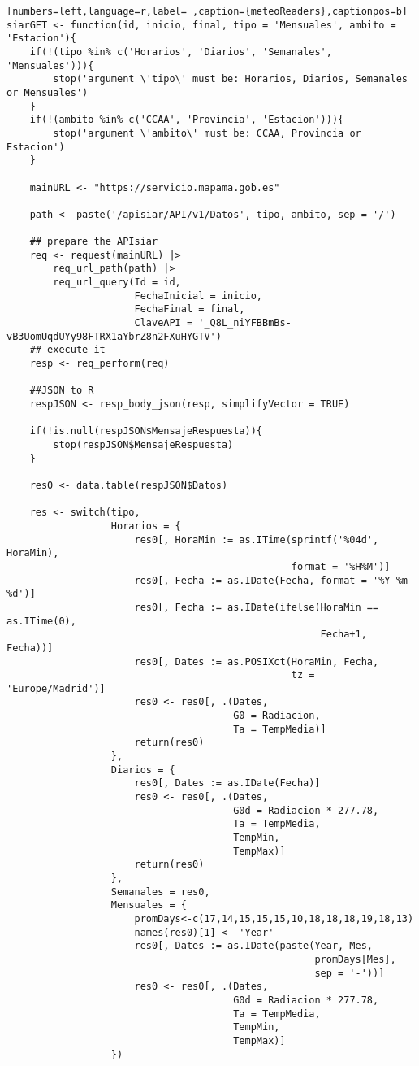 \begin{lstlisting}[numbers=left,language=r,label= ,caption={meteoReaders},captionpos=b]
siarGET <- function(id, inicio, final, tipo = 'Mensuales', ambito = 'Estacion'){
    if(!(tipo %in% c('Horarios', 'Diarios', 'Semanales', 'Mensuales'))){
        stop('argument \'tipo\' must be: Horarios, Diarios, Semanales or Mensuales')
    }
    if(!(ambito %in% c('CCAA', 'Provincia', 'Estacion'))){
        stop('argument \'ambito\' must be: CCAA, Provincia or Estacion')
    }

    mainURL <- "https://servicio.mapama.gob.es"

    path <- paste('/apisiar/API/v1/Datos', tipo, ambito, sep = '/')

    ## prepare the APIsiar
    req <- request(mainURL) |>
        req_url_path(path) |>
        req_url_query(Id = id,
                      FechaInicial = inicio,
                      FechaFinal = final,
                      ClaveAPI = '_Q8L_niYFBBmBs-vB3UomUqdUYy98FTRX1aYbrZ8n2FXuHYGTV')
    ## execute it
    resp <- req_perform(req)

    ##JSON to R
    respJSON <- resp_body_json(resp, simplifyVector = TRUE)

    if(!is.null(respJSON$MensajeRespuesta)){
        stop(respJSON$MensajeRespuesta)
    }

    res0 <- data.table(respJSON$Datos)

    res <- switch(tipo,
                  Horarios = {
                      res0[, HoraMin := as.ITime(sprintf('%04d', HoraMin),
                                                 format = '%H%M')]
                      res0[, Fecha := as.IDate(Fecha, format = '%Y-%m-%d')]
                      res0[, Fecha := as.IDate(ifelse(HoraMin == as.ITime(0),
                                                      Fecha+1, Fecha))]
                      res0[, Dates := as.POSIXct(HoraMin, Fecha,
                                                 tz = 'Europe/Madrid')]
                      res0 <- res0[, .(Dates,
                                       G0 = Radiacion,
                                       Ta = TempMedia)]
                      return(res0)
                  },
                  Diarios = {
                      res0[, Dates := as.IDate(Fecha)]
                      res0 <- res0[, .(Dates,
                                       G0d = Radiacion * 277.78,
                                       Ta = TempMedia,
                                       TempMin,
                                       TempMax)]
                      return(res0)
                  },
                  Semanales = res0,
                  Mensuales = {
                      promDays<-c(17,14,15,15,15,10,18,18,18,19,18,13)
                      names(res0)[1] <- 'Year'
                      res0[, Dates := as.IDate(paste(Year, Mes,
                                                     promDays[Mes],
                                                     sep = '-'))]
                      res0 <- res0[, .(Dates,
                                       G0d = Radiacion * 277.78,
                                       Ta = TempMedia,
                                       TempMin,
                                       TempMax)]
                  })


\end{lstlisting}
